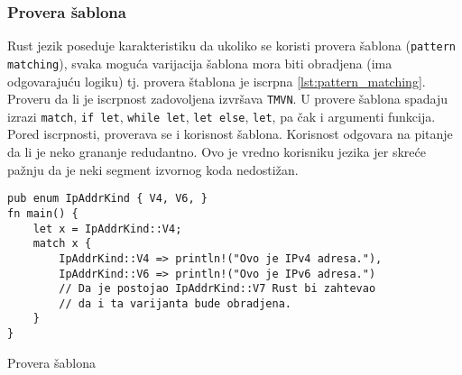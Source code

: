 \subsubsection{Provera šablona}
Rust jezik poseduje karakteristiku da ukoliko se koristi provera šablona (\verb|pattern matching|), svaka moguća 
varijacija šablona mora biti obradjena (ima odgovarajuću logiku) tj. provera štablona je iscrpna \ref{lst:pattern_matching}.
Proveru da li je iscrpnost zadovoljena izvršava \verb|TMVN|. U provere šablona spadaju izrazi \verb|match|, \verb|if let|, \verb|while let|,
\verb|let else|, \verb|let|, pa čak i argumenti funkcija. Pored iscrpnosti, proverava se i korisnost šablona. Korisnost odgovara na pitanje 
da li je neko grananje redudantno. Ovo je vredno korisniku jezika jer skreće pažnju da je neki segment izvornog koda nedostižan. 



\begin{listing}[H]
\begin{verbatim}
pub enum IpAddrKind { V4, V6, }
fn main() {
    let x = IpAddrKind::V4;
    match x {
        IpAddrKind::V4 => println!("Ovo je IPv4 adresa."), 
        IpAddrKind::V6 => println!("Ovo je IPv6 adresa.") 
        // Da je postojao IpAddrKind::V7 Rust bi zahtevao 
        // da i ta varijanta bude obradjena.
    }
}
\end{verbatim}
\caption{Provera šablona}
\label{lst:pattern_matching}
\end{listing}